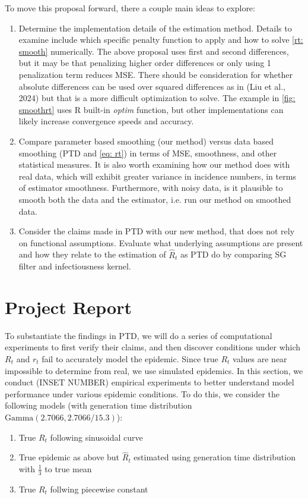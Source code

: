 \documentclass[12pt]{article}
\begin{document}
      To move this proposal forward, there a couple main ideas to explore:
      \begin{enumerate}
          \item Determine the implementation details of the estimation method. Details to examine include which specific penalty function to apply and
          how to solve \cref{rt: smooth} numerically. The above proposal uses first and second differences, but it may be that penalizing higher order
          differences or only using 1 penalization term reduces MSE. There should be consideration for whether absolute differences can be used
          over squared differences as in (Liu et al., 2024) but that is a more difficult optimization to solve. The example in \cref{fig: smoothrt}
          uses R built-in \textit{optim} function, but other implementations can likely increase convergence speeds and accuracy.
          \item Compare parameter based smoothing (our method) versus data based smoothing (PTD and \cref{eq: rt}) in terms of MSE, smoothness, and 
          other statistical measures. It is also worth examining how our method does with real data, which will exhibit greater variance in incidence numbers,
          in terms of estimator smoothness. Furthermore, with noisy data, is it plausible to smooth both the data and the estimator, i.e. run our method
          on smoothed data.
          \item Consider the claims made in PTD with our new method, that does not rely on functional assumptions. Evaluate what underlying assumptions are 
          present and how they relate to the estimation of $\hat{R}_t$ as PTD do by comparing SG filter and infectiousness kernel.
      \end{enumerate}






  \section{Project Report} 
      To substantiate the findings in PTD, we will do a series of computational experiments to first verify their claims, 
      and then discover conditions under which $R_t$ and $r_t$ fail to accurately model the epidemic. Since true $R_t$ values are
      near impossible to determine from real, we use simulated epidemics. In this section, we conduct (INSET NUMBER) empirical 
      experiments to better understand model performance under various epidemic conditions. To do this, we consider the 
      following models (with generation time distribution $\text{Gamma}(2.7066, 2.7066 / 15.3)$):
      \begin{enumerate}
        \item True $R_t$ following sinusoidal curve
        \item True epidemic as above but $\hat{R}_t$ estimated using generation time distribution with $\frac{1}{3}$ to true mean
        \item True $R_t$ follwing piecewise constant
      \end{enumerate}
\end{document}
